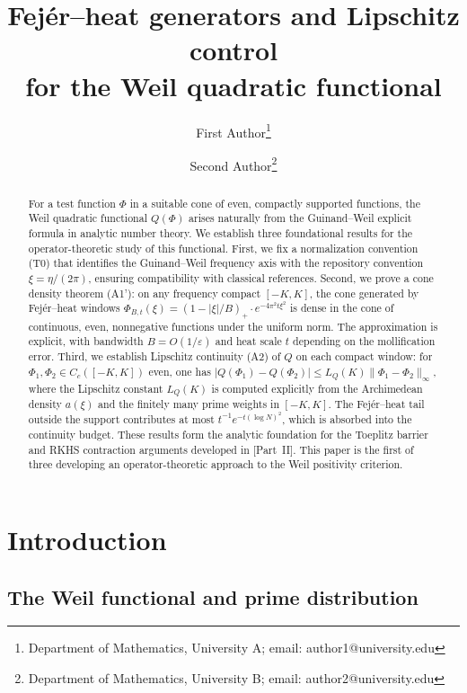 \documentclass[11pt,a4paper]{article}
\title{Fej\'er--heat generators and Lipschitz control\\for the Weil quadratic functional}
\author{
  {\sc First Author}\thanks{Department of Mathematics, University A; email: author1@university.edu}
  \and
  {\sc Second Author}\thanks{Department of Mathematics, University B; email: author2@university.edu}
}
\date{}
\theoremstyle{definition}
\theoremstyle{remark}
\begin{document}
\maketitle

\begin{abstract}
For a test function $\Phi$ in a suitable cone of even, compactly supported functions, the Weil quadratic functional $Q(\Phi)$ arises naturally from the Guinand--Weil explicit formula in analytic number theory. We establish three foundational results for the operator-theoretic study of this functional. First, we fix a normalization convention (T0) that identifies the Guinand--Weil frequency axis with the repository convention $\xi = \eta/(2\pi)$, ensuring compatibility with classical references. Second, we prove a cone density theorem (A1'): on any frequency compact $[-K, K]$, the cone generated by Fej\'er--heat windows $\Phi_{B,t}(\xi) = (1 - |\xi|/B)_+ \cdot e^{-4\pi^2 t \xi^2}$ is dense in the cone of continuous, even, nonnegative functions under the uniform norm. The approximation is explicit, with bandwidth $B = O(1/\varepsilon)$ and heat scale $t$ depending on the mollification error. Third, we establish Lipschitz continuity (A2) of $Q$ on each compact window: for $\Phi_1, \Phi_2 \in C_c([-K,K])$ even, one has $|Q(\Phi_1) - Q(\Phi_2)| \leq L_Q(K) \|\Phi_1 - \Phi_2\|_\infty$, where the Lipschitz constant $L_Q(K)$ is computed explicitly from the Archimedean density $a(\xi)$ and the finitely many prime weights in $[-K,K]$. The Fej\'er--heat tail outside the support contributes at most $t^{-1} e^{-t(\log N)^2}$, which is absorbed into the continuity budget. These results form the analytic foundation for the Toeplitz barrier and RKHS contraction arguments developed in [Part~II]. This paper is the first of three developing an operator-theoretic approach to the Weil positivity criterion.
\end{abstract}

\tableofcontents

\section{Introduction}

\subsection{The Weil functional and prime distribution}
\end{document}
